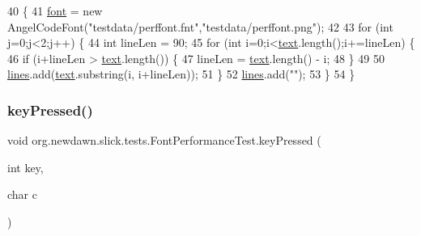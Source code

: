 \begin{DoxyCode}
40                                                                     \{
41         \mbox{\hyperlink{classorg_1_1newdawn_1_1slick_1_1tests_1_1_font_performance_test_ad95c36f18e4854afd788ccdec98685d3}{font}} = \textcolor{keyword}{new} AngelCodeFont(\textcolor{stringliteral}{"testdata/perffont.fnt"},\textcolor{stringliteral}{"testdata/perffont.png"});
42         
43         \textcolor{keywordflow}{for} (\textcolor{keywordtype}{int} j=0;j<2;j++) \{
44             \textcolor{keywordtype}{int} lineLen = 90;
45             \textcolor{keywordflow}{for} (\textcolor{keywordtype}{int} i=0;i<\mbox{\hyperlink{classorg_1_1newdawn_1_1slick_1_1tests_1_1_font_performance_test_a328e2fdc2cb6a5efd2a5c6388329c739}{text}}.length();i+=lineLen) \{
46                 \textcolor{keywordflow}{if} (i+lineLen > \mbox{\hyperlink{classorg_1_1newdawn_1_1slick_1_1tests_1_1_font_performance_test_a328e2fdc2cb6a5efd2a5c6388329c739}{text}}.length()) \{
47                     lineLen = \mbox{\hyperlink{classorg_1_1newdawn_1_1slick_1_1tests_1_1_font_performance_test_a328e2fdc2cb6a5efd2a5c6388329c739}{text}}.length() - i;
48                 \}
49                 
50                 \mbox{\hyperlink{classorg_1_1newdawn_1_1slick_1_1tests_1_1_font_performance_test_ac03ca3c0d900997715e7325c76ea0257}{lines}}.add(\mbox{\hyperlink{classorg_1_1newdawn_1_1slick_1_1tests_1_1_font_performance_test_a328e2fdc2cb6a5efd2a5c6388329c739}{text}}.substring(i, i+lineLen));   
51             \}
52             \mbox{\hyperlink{classorg_1_1newdawn_1_1slick_1_1tests_1_1_font_performance_test_ac03ca3c0d900997715e7325c76ea0257}{lines}}.add(\textcolor{stringliteral}{""});
53         \}
54     \}
\end{DoxyCode}
\mbox{\label{classorg_1_1newdawn_1_1slick_1_1tests_1_1_font_performance_test_adf4c0f4b3f99963f3fc7ef3756c52100}} 
\subsubsection{\texorpdfstring{key\+Pressed()}{keyPressed()}}
{\footnotesize\ttfamily void org.\+newdawn.\+slick.\+tests.\+Font\+Performance\+Test.\+key\+Pressed (\begin{DoxyParamCaption}\item[{int}]{key,  }\item[{char}]{c }\end{DoxyParamCaption})\hspace{0.3cm}{\ttfamily [inline]}}


